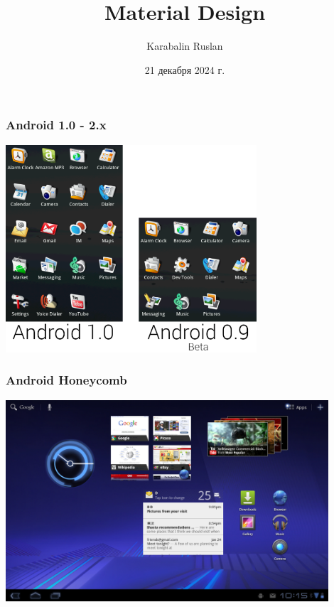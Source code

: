 \documentclass[12pt]{beamer}
\title{Material Design}
\author{Karabalin Ruslan}
\date{21 декабря 2024 г.}
\begin{document}
	
	\begin{frame}
		\titlepage
	\end{frame}
	
    \begin{frame}
        \frametitle{Android 1.0 - 2.x}
        \begin{center}
            \includegraphics[width=0.7\textwidth]{android-1-0.png}
        \end{center}
    \end{frame}

    \begin{frame}
        \frametitle{Android Honeycomb}
        \begin{center}
            \includegraphics[width=0.9\textwidth]{android-3-0.png}
        \end{center}
    \end{frame}
\end{document}
